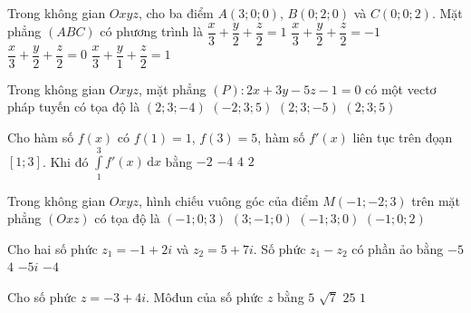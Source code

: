 \begin{ex}%
	Trong không gian $Oxyz$, cho ba điểm $A(3; 0; 0)$, $B (0; 2; 0)$ và $C(0; 0; 2)$. Mặt phẳng $(ABC)$ có phương trình là
	\choice
	{\True $\dfrac{x}{3}+\dfrac{y}{2}+\dfrac{z}{2}=1$}
	{$\dfrac{x}{3}+\dfrac{y}{2}+\dfrac{z}{2}=-1$}
	{$\dfrac{x}{3}+\dfrac{y}{2}+\dfrac{z}{2}=0$}
	{$\dfrac{x}{3}+\dfrac{y}{1}+\dfrac{z}{2}=1$}	
\end{ex}

\begin{ex}%
	Trong không gian $Oxyz$, mặt phẳng $(P)\colon 2x+3y-5z-1=0$ có một vectơ pháp tuyến có tọa độ là	
	\choice
	{$(2;3;-4)$}
	{$(-2;3;5)$}
	{\True $(2;3;-5)$}
	{$(2;3;5)$}	
\end{ex}

\begin{ex}%
	Cho hàm số $f(x)$ có $f(1)=1$, $f(3)=5$, hàm số $f'(x)$ liên tục trên đọạn $[1;3]$. Khi đó $\displaystyle\int\limits_1^3 f'(x)\mathrm{\,d}x$ bằng
	\choice
	{$-2$}
	{$-4$}
	{\True $4$}
	{$2$}	
\end{ex}

\begin{ex}%
	Trong không gian $Oxyz$, hình chiếu vuông góc của điểm $M(-1;-2;3)$ trên mặt phẳng $(Oxz)$ có tọa độ là
	\choice
	{\True $(-1;0;3)$}
	{$(3;-1;0)$}
	{$(-1;3;0)$}
	{$(-1;0;2)$}	
\end{ex}

\begin{ex}%
	Cho hai số phức $z_1=-1+2 i$ và $z_2=5+7i$. Số phức $z_1-z_2$ có phần ảo bằng
	\choice
	{\True $-5$}
	{$4$}
	{$-5i$}
	{$-4$}	
\end{ex}

\begin{ex}%
	Cho số phức $z=-3+4 i$. Môđun của số phức $z$ bằng
	\choice
	{\True $5 $}
	{$\sqrt{7}$}
	{$25$}
	{$1$}	
\end{ex}


